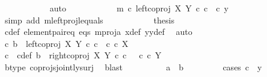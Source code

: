 \begin{isabellebody}
\ \ \ \ \ \ \ \ \ \ \isamarkupfalse%
\ auto\isanewline
\ \ \ \ \ \ \ \ \isamarkupfalse%
\ \isamarkupfalse%
\ {\isachardoublequoteopen}m\ {\isasymcirc}\isactrlsub c\ left{\isacharunderscore}{\kern0pt}coproj\ X\ Y\ {\isasymcirc}\isactrlsub c\ c\ {\isacharequal}{\kern0pt}\ {\isasymlangle}c{\isacharcomma}{\kern0pt}\ y{}{\isasymrangle}{\isachardoublequoteclose}\isanewline
\ \ \ \ \ \ \ \ \ \ \isamarkupfalse%
\ {\isacharparenleft}{\kern0pt}simp\ add{\isacharcolon}{\kern0pt}\ m{\isacharunderscore}{\kern0pt}leftproj{\isacharunderscore}{\kern0pt}l{\isacharunderscore}{\kern0pt}equals{\isacharparenright}{\kern0pt}\isanewline
\ \ \ \ \ \ \ \ \isamarkupfalse%
\ \isamarkupfalse%
\ {\isacharquery}{\kern0pt}thesis\isanewline
\ \ \ \ \ \ \ \ \ \ \isamarkupfalse%
\ c{\isacharunderscore}{\kern0pt}def\ element{\isacharunderscore}{\kern0pt}pair{\isacharunderscore}{\kern0pt}eq\ eqs\ m{\isacharunderscore}{\kern0pt}proj{\isacharunderscore}{\kern0pt}a\ x{\isacharunderscore}{\kern0pt}def\ y{}y{}{\isacharunderscore}{\kern0pt}def{\isacharparenleft}{\kern0pt}{}{\isacharparenright}{\kern0pt}\ \isamarkupfalse%
\ auto\isanewline
\ \ \ \ \ \ \isamarkupfalse%
\isanewline
\ \ \ \ \ \ \ \ \isamarkupfalse%
\ {\isachardoublequoteopen}{\isasymnexists}c{\isachardot}{\kern0pt}\ b\ {\isacharequal}{\kern0pt}\ left{\isacharunderscore}{\kern0pt}coproj\ X\ Y\ {\isasymcirc}\isactrlsub c\ c\ {\isasymand}\ c\ {\isasymin}\isactrlsub c\ X{\isachardoublequoteclose}\isanewline
\ \ \ \ \ \ \ \ \isamarkupfalse%
\ \isamarkupfalse%
\ c\ \ c{\isacharunderscore}{\kern0pt}def{\isacharcolon}{\kern0pt}\ {\isachardoublequoteopen}b\ {\isacharequal}{\kern0pt}\ right{\isacharunderscore}{\kern0pt}coproj\ X\ Y\ {\isasymcirc}\isactrlsub c\ c\ \ {\isasymand}\ c\ {\isasymin}\isactrlsub c\ Y{\isachardoublequoteclose}\isanewline
\ \ \ \ \ \ \ \ \ \ \isamarkupfalse%
\ b{\isacharunderscore}{\kern0pt}type\ coprojs{\isacharunderscore}{\kern0pt}jointly{\isacharunderscore}{\kern0pt}surj\ \isamarkupfalse%
\ blast\isanewline
\ \ \ \ \ \ \ \ \isamarkupfalse%
\ {\isachardoublequoteopen}a\ {\isacharequal}{\kern0pt}\ b{\isachardoublequoteclose}\isanewline
\ \ \ \ \ \ \ \ \isamarkupfalse%
{\isacharparenleft}{\kern0pt}cases\ {\isachardoublequoteopen}c\ {\isacharequal}{\kern0pt}\ y{}{\isachardoublequoteclose}{\isacharparenright}{\kern0pt}\isanewline

\end{isabellebody}
